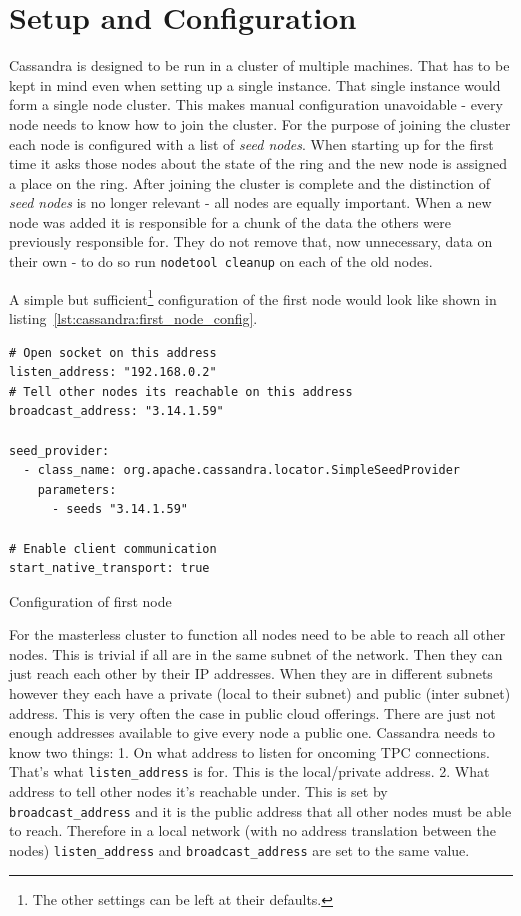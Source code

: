 \section{Setup and Configuration}  %
Cassandra is designed to be run in a cluster of multiple machines. That has to be kept in mind even when setting up a single instance. That single instance would form a single node cluster. This makes manual configuration unavoidable - every node needs to know how to join the cluster.
For the purpose of joining the cluster each node is configured with a list of \textit{seed nodes}. When starting up for the first time it asks those nodes about the state of the ring and the new node is assigned a place on the ring. After joining the cluster is complete and the distinction of \textit{seed nodes} is no longer relevant - all nodes are equally important.
When a new node was added it is responsible for a chunk of the data the others were previously responsible for. They do not remove that, now unnecessary, data on their own - to do so run \texttt{nodetool cleanup} on each of the old nodes.

A simple but sufficient\footnote{The other settings can be left at their defaults.} configuration of the first node would look like shown in listing~\ref{lst:cassandra:first_node_config}. \autocite{cassandra_config}

\begin{listing}[ht]
  \begin{verbatim}
# Open socket on this address
listen_address: "192.168.0.2"
# Tell other nodes its reachable on this address
broadcast_address: "3.14.1.59"

seed_provider:
  - class_name: org.apache.cassandra.locator.SimpleSeedProvider
    parameters:
      - seeds "3.14.1.59"

# Enable client communication
start_native_transport: true
  \end{verbatim}
  \caption{Configuration of first node}
  \label{lst:cassandra:first_node_config}
\end{listing}

For the masterless cluster to function all nodes need to be able to reach all other nodes. This is trivial if all are in the same subnet of the network. Then they can just reach each other by their IP addresses.
When they are in different subnets however they each have a private (local to their subnet) and public (inter subnet) address. This is very often the case in public cloud offerings. There are just not enough addresses available to give every node a public one.
Cassandra needs to know two things:
1. On what address to listen for oncoming TPC connections. That's what \texttt{listen\_address} is for. This is the local/private address.
2. What address to tell other nodes it's reachable under. This is set by \texttt{broadcast\_address} and it is the public address that all other nodes must be able to reach.
Therefore in a local network (with no address translation between the nodes) \texttt{listen\_address} and \texttt{broadcast\_address} are set to the same value.

